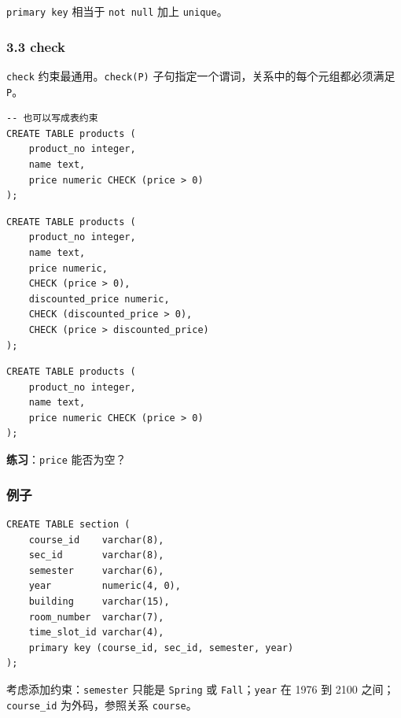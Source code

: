 \documentclass[aspectratio=169, 14pt]{beamer}
\begin{document}
{
\begin{frame}[standout]
  \texttt{primary key} 相当于 \texttt{not null} 加上 \texttt{unique}。
\end{frame}
}

\begin{frame}[fragile]
    \frametitle{3.3 check}
\texttt{check} 约束最通用。\texttt{check(P)} 子句指定一个谓词，关系中的每个元组都必须满足 \texttt{P}。

\begin{verbatim}
-- 也可以写成表约束
CREATE TABLE products (
    product_no integer,
    name text,
    price numeric CHECK (price > 0)
);
\end{verbatim}

\end{frame}

\begin{frame}[fragile]

    \begin{verbatim}
CREATE TABLE products (
    product_no integer,
    name text,
    price numeric,
    CHECK (price > 0),
    discounted_price numeric,
    CHECK (discounted_price > 0),
    CHECK (price > discounted_price)
);
    \end{verbatim}
\end{frame}

\begin{frame}[fragile]
    \begin{verbatim}
CREATE TABLE products (
    product_no integer,
    name text,
    price numeric CHECK (price > 0)
);
    \end{verbatim}
\textbf{练习}：\texttt{price} 能否为空？

\pause


\end{frame}

\begin{frame}[fragile]
    \frametitle{例子}

\begin{verbatim}
CREATE TABLE section (
    course_id    varchar(8),
    sec_id       varchar(8),
    semester     varchar(6),
    year         numeric(4, 0),
    building     varchar(15),
    room_number  varchar(7),
    time_slot_id varchar(4),
    primary key (course_id, sec_id, semester, year)
);
\end{verbatim}
    
考虑添加约束：\texttt{semester} 只能是 \texttt{Spring} 或 \texttt{Fall}；\texttt{year} 在 1976 到 2100 之间；\texttt{course\_id} 为外码，参照关系 \texttt{course}。
\end{frame}
\end{document}
